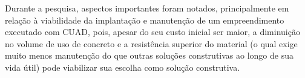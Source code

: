 Durante a pesquisa, aspectos importantes foram notados, principalmente em relação à viabilidade da implantação e manutenção de um empreendimento executado com CUAD, pois, apesar do seu custo inicial ser maior, a diminuição no volume de uso de concreto e a resistência superior do material (o qual exige muito menos manutenção do que outras soluções construtivas ao longo de sua vida útil) pode viabilizar sua escolha como solução construtiva.








